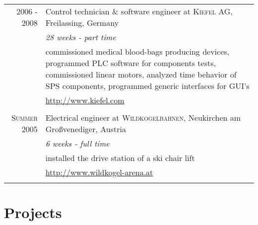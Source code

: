\documentclass[a4paper,10pt]{article}
\begin{document}
\begin{longtable}{r|p{11cm}}
\textsc{2006 - 2008} & Control technician \& software engineer at \textsc{Kiefel AG}, Freilassing, Germany \\
&\emph{28 weeks - part time}\\
& \footnotesize{commissioned medical blood-bags producing devices, programmed PLC software for components tests, commissioned linear motors, analyzed time behavior of SPS components, programmed generic interfaces for GUI's }\\
& \href{http://www.kiefel.com}{http://www.kiefel.com}\\
\multicolumn{2}{c}{} \\

\textsc{Summer 2005} & Electrical engineer at \textsc{Wildkogelbahnen}, Neukirchen am Großvenediger, Austria\\
&\emph{6 weeks - full time}\\
& \footnotesize{installed the drive station of a ski chair lift}\\
& \href{http://www.wildkogel-arena.at}{http://www.wildkogel-arena.at}\\
\multicolumn{2}{c}{} \\

\end{longtable}


\pagebreak

\section{Projects}
\end{document}
